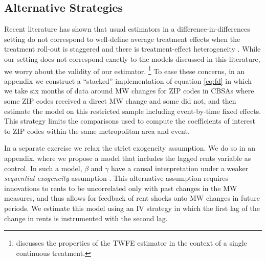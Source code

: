 

\subsection{Alternative Strategies}\label{sec:alt_emp_strategies}

Recent literature has shown that usual estimators in a difference-in-differences 
setting do not correspond to well-define average treatment effects when the 
treatment roll-out is staggered and there is treatment-effect heterogeneity 
\parencite{deChaisemartinEtAl2022,RothEtAl2022}.
While our setting does not correspond exactly to the models discussed in this
literature, we worry about the validity of our estimator.%
\footnote{\textcite[][Section 3.4]{CallawayEtAl2021} discusses the properties 
of the TWFE estimator in the context of a single continuous treatment.}
To ease these concerns, in an appendix we construct a ``stacked'' implementation 
of equation \eqref{eq:fd} in which we take six months of data around MW changes 
for ZIP codes in CBSAs where some ZIP codes received a direct MW change and 
some did not, 
and then estimate the model on this restricted sample including event-by-time 
fixed effects.
This strategy limits the comparisons used to compute the coefficients of 
interest to ZIP codes within the same metropolitan area and event.

In a separate exercise we relax the strict exogeneity assumption.
We do so in an appendix, where we propose a model that includes the lagged 
rents variable as control.
In such a model, $\beta$ and $\gamma$ have a causal interpretation under a 
weaker \textit{sequential exogeneity} assumption
\parencite{ArellanoBond1991, ArellanoHonore2001}.
This alternative assumption requires innovations to rents to be uncorrelated 
only with past changes in the MW measures, and thus allows for feedback of 
rent shocks onto MW changes in future periods.
We estimate this model using an IV strategy in which the first lag of the change
in rents is instrumented with the second lag.


